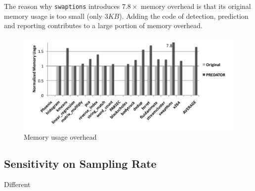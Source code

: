 The reason why \texttt{swaptions} introduces $7.8\times$ memory overhead is that 
its original memory usage is too small (only $3KB$).
Adding the code of detection, prediction and
reporting contributes to a large portion of memory overhead. 

\begin{figure}
\begin{center} 
\includegraphics[width=6.5in]{fig/memusage}
\end{center}
\caption{Memory usage overhead}
\label{fig:memusage}
\end{figure}


\subsection{Sensitivity on Sampling Rate}
\label{sec:sensitivity}
Different 
